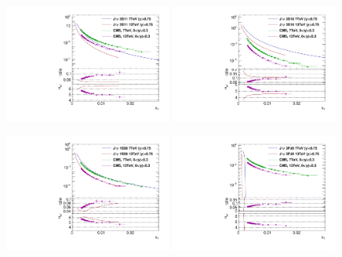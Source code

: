 \documentclass[a4paper,10pt]{article}
\begin{document}
 \begin{figure}
  \begin{center}
   \includegraphics[width=0.49\textwidth]{theory_3S11_midrap.pdf}
   \includegraphics[width=0.49\textwidth]{theory_3S18_midrap.pdf}
   
   \includegraphics[width=0.49\textwidth]{theory_1s08_midrap.pdf}
   \includegraphics[width=0.49\textwidth]{theory_3PJ8_midrap.pdf}
  \end{center}

 \end{figure}
\end{document}
